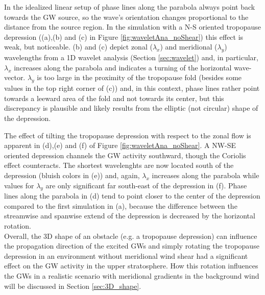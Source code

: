 In the idealized linear setup of \textcite[]{smith_linear_1980} phase lines along the parabola always point back towards the GW source, so the wave's orientation changes proportional to the distance from the source region. In the simulation with a N-S oriented tropopause depression ((a),(b) and (c) in Figure \ref{fig:waveletAna_noShear}) this effect is weak, but noticeable. (b) and (c) depict zonal ($\lambda_x$) and meridional ($\lambda_y$) wavelengths from a 1D wavelet analysis (Section \ref{sec:wavelet}) and, in particular, $\lambda_x$ increases along the parabola and indicates a turning of the horizontal wave-vector. $\lambda_y$ is too large in the proximity of the tropopause fold (besides some values in the top right corner of (c)) and, in this context, phase lines rather point towards a leeward area of the fold and not towards its center, but this discrepancy is plausible and likely results from the elliptic (not circular) shape of the depression.

The effect of tilting the tropopause depression with respect to the zonal flow is apparent in (d),(e) and (f) of Figure \ref{fig:waveletAna_noShear}. A NW-SE oriented depression channels the GW activity southward, though the Coriolis effect counteracts. The shortest wavelenghts are now located south of the depression (bluish colors in (e)) and, again, $\lambda_x$ increases along the parabola while values for $\lambda_y$ are only significant far south-east of the depression in (f). Phase lines along the parabola in (d) tend to point closer to the center of the depression compared to the first simulation in (a), because the difference between the streamwise and spanwise extend of the depression is decreased by the horizontal rotation. \\
Overall, the 3D shape of an obstacle (e.g. a tropopause depression) can influence the propagation direction of the excited GWs and simply rotating the tropopause depression in an environment without meridional wind shear had a significant effect on the GW activity in the upper stratosphere. How this rotation influences the GWs in a realistic scenario with meridional gradients in the background wind will be discussed in Section \ref{sec:3D_shape}. 


